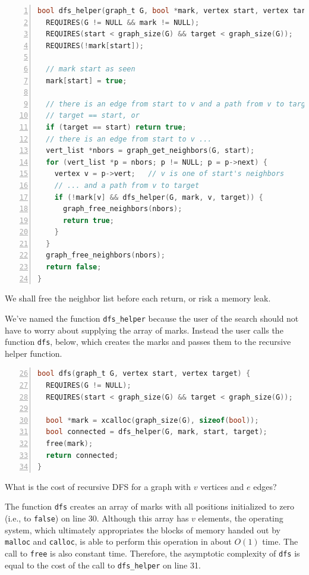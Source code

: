 \begin{lstlisting}[language=c, numbers=left]
bool dfs_helper(graph_t G, bool *mark, vertex start, vertex target) {
  REQUIRES(G != NULL && mark != NULL);
  REQUIRES(start < graph_size(G) && target < graph_size(G));
  REQUIRES(!mark[start]);

  // mark start as seen
  mark[start] = true;

  // there is an edge from start to v and a path from v to target if...
  // target == start, or
  if (target == start) return true;
  // there is an edge from start to v ...
  vert_list *nbors = graph_get_neighbors(G, start);
  for (vert_list *p = nbors; p != NULL; p = p->next) {
    vertex v = p->vert;   // v is one of start's neighbors
    // ... and a path from v to target
    if (!mark[v] && dfs_helper(G, mark, v, target)) {
      graph_free_neighbors(nbors);
      return true;
    }
  }
  graph_free_neighbors(nbors);
  return false;
}
\end{lstlisting}
We shall free the neighbor list before each return, or risk a memory
leak.

We've named the function \lstinline'dfs_helper' because the user of the
search should not have to worry about supplying the array of
marks. Instead the user calls the function \lstinline'dfs', below, which
creates the marks and passes them to the recursive helper function.
\begin{lstlisting}[language=c, numbers=left, firstnumber=26]
bool dfs(graph_t G, vertex start, vertex target) {
  REQUIRES(G != NULL);
  REQUIRES(start < graph_size(G) && target < graph_size(G));

  bool *mark = xcalloc(graph_size(G), sizeof(bool));
  bool connected = dfs_helper(G, mark, start, target);
  free(mark);
  return connected;
}
\end{lstlisting}

What is the cost of recursive DFS for a graph with $v$ vertices and
$e$ edges?

The function \lstinline'dfs' creates an array of marks with all
positions initialized to zero (i.e., to \lstinline'false') on
line 30.  Although this array has $v$ elements, the
operating system, which ultimately appropriates the blocks of memory
handed out by \lstinline'malloc' and \lstinline'calloc', is able to
perform this operation in about $O(1)$ time.  The call to
\lstinline'free' is also constant time.  Therefore, the asymptotic
complexity of \lstinline'dfs' is equal to the cost of the call to
\lstinline'dfs_helper' on line 31.

